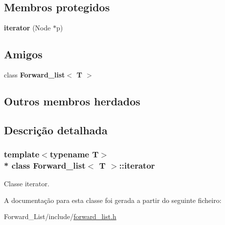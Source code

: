 \subsection*{Membros protegidos}
\begin{DoxyCompactItemize}
\item 
{\bfseries iterator} (Node $\ast$p)\hypertarget{class_forward__list_1_1iterator_a467fad82452066feaa38e615756b1c6e}{}\label{class_forward__list_1_1iterator_a467fad82452066feaa38e615756b1c6e}

\end{DoxyCompactItemize}
\subsection*{Amigos}
\begin{DoxyCompactItemize}
\item 
class {\bfseries Forward\+\_\+list$<$ T $>$}\hypertarget{class_forward__list_1_1iterator_a3248a6782762842dd0d50fa2ff16e968}{}\label{class_forward__list_1_1iterator_a3248a6782762842dd0d50fa2ff16e968}

\end{DoxyCompactItemize}
\subsection*{Outros membros herdados}


\subsection{Descrição detalhada}
\subsubsection*{template$<$typename T$>$\\*
class Forward\+\_\+list$<$ T $>$\+::iterator}

Classe iterator. 

A documentação para esta classe foi gerada a partir do seguinte ficheiro\+:\begin{DoxyCompactItemize}
\item 
Forward\+\_\+\+List/include/\hyperlink{forward__list_8h}{forward\+\_\+list.\+h}\end{DoxyCompactItemize}
